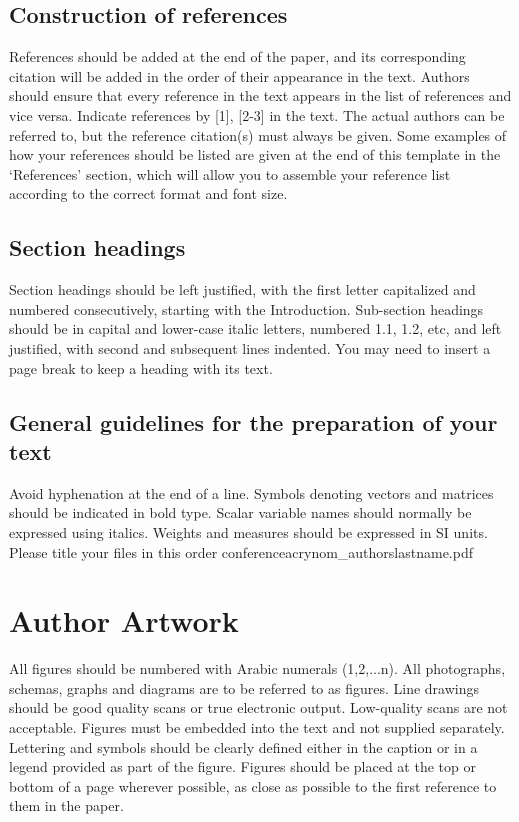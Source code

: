 \documentclass[3p,times,procedia]{elsarticle}
\begin{document}
\subsection{ Construction of references}

References should be added at the end of the paper, and its corresponding citation will be added in the order of their appearance in the text. Authors should ensure that every reference in the text appears in the list of references and vice versa. Indicate references by [1], [2-3] in the text. The actual authors can be referred to, but the reference citation(s) must always be given. Some examples of how your references should be listed are given at the end of this template in the `References' section, which will allow you to assemble your reference list according to the correct format and font size.

\subsection{Section headings}
Section headings should be left justified, with the first letter capitalized and numbered consecutively, starting with the Introduction. Sub-section headings should be in capital and lower-case italic letters, numbered 1.1, 1.2, etc, and left justified, with second and subsequent lines indented. You may need to insert a page break to keep a heading with its text.

\subsection{General guidelines for the preparation of your text}
Avoid hyphenation at the end of a line. Symbols denoting vectors and matrices should be indicated in bold type. Scalar variable names should normally be expressed using italics. Weights and measures should be expressed in SI units. Please title your files in this order conferenceacrynom\_authorslastname.pdf

\section{ Author Artwork}
All figures should be numbered with Arabic numerals (1,2,...n). All photographs, schemas, graphs and diagrams are to be referred to as figures. Line drawings should be good quality scans or true electronic output. Low-quality scans are not acceptable. Figures must be embedded into the text and not supplied separately. Lettering and symbols should be clearly defined either in the caption or in a legend provided as part of the figure. Figures should be placed at the top or bottom of a page wherever possible, as close as possible to the first reference to them in the paper.
\end{document}
